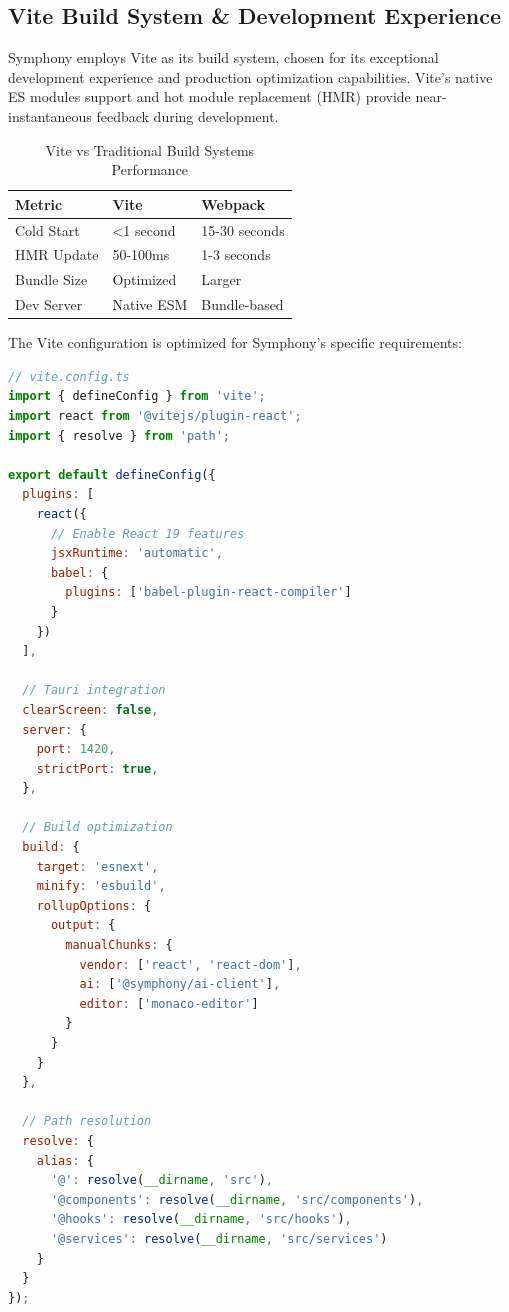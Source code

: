 \subsection*{Vite Build System \& Development Experience}

Symphony employs Vite as its build system, chosen for its exceptional development experience and production optimization capabilities. Vite's native ES modules support and hot module replacement (HMR) provide near-instantaneous feedback during development.

\begin{table}[h]
\centering
\caption{Vite vs Traditional Build Systems Performance}
\begin{tabular}{@{}lll@{}}
\toprule
\textbf{Metric} & \textbf{Vite} & \textbf{Webpack} \\
\midrule
Cold Start & <1 second & 15-30 seconds \\
HMR Update & 50-100ms & 1-3 seconds \\
Bundle Size & Optimized & Larger \\
Dev Server & Native ESM & Bundle-based \\
\bottomrule
\end{tabular}
\end{table}

The Vite configuration is optimized for Symphony's specific requirements:

\begin{lstlisting}[language=JavaScript, caption=Vite Configuration for Symphony]
// vite.config.ts
import { defineConfig } from 'vite';
import react from '@vitejs/plugin-react';
import { resolve } from 'path';

export default defineConfig({
  plugins: [
    react({
      // Enable React 19 features
      jsxRuntime: 'automatic',
      babel: {
        plugins: ['babel-plugin-react-compiler']
      }
    })
  ],
  
  // Tauri integration
  clearScreen: false,
  server: {
    port: 1420,
    strictPort: true,
  },
  
  // Build optimization
  build: {
    target: 'esnext',
    minify: 'esbuild',
    rollupOptions: {
      output: {
        manualChunks: {
          vendor: ['react', 'react-dom'],
          ai: ['@symphony/ai-client'],
          editor: ['monaco-editor']
        }
      }
    }
  },
  
  // Path resolution
  resolve: {
    alias: {
      '@': resolve(__dirname, 'src'),
      '@components': resolve(__dirname, 'src/components'),
      '@hooks': resolve(__dirname, 'src/hooks'),
      '@services': resolve(__dirname, 'src/services')
    }
  }
});
\end{lstlisting}

